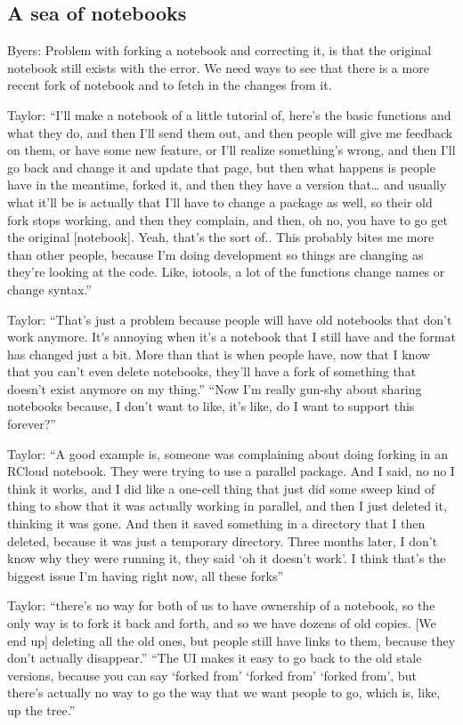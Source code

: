 \subsection{A sea of notebooks}

Byers: Problem with forking a notebook and correcting it, is that the original notebook still exists with the error.  We need ways to see that there is a more recent fork of notebook and to fetch in the changes from it.

Taylor: ``I'll make a notebook of a little tutorial of, here's the basic functions and what they do, and then I'll send them out, and then people will give me feedback on them, or have some new feature, or I'll realize something's wrong, and then I'll go back and change it and update that page, but then what happens is people have in the meantime, forked it, and then they have a version that… and usually what it'll be is actually that I'll have to change a package as well, so their old fork stops working, and then they complain, and then, oh no, you have to go get the original [notebook]. Yeah, that's the sort of.. This probably bites me more than other people, because I'm doing development so things are changing as they're looking at the code. Like, iotools, a lot of the functions change names or change syntax.''

Taylor: ``That's just a problem because people will have old notebooks that don't work anymore. It's annoying when it's a notebook that I still have and the format has changed just a bit. More than that is when people have, now that I know that you can't even delete notebooks, they'll have a fork of something that doesn't exist anymore on my thing.'' ``Now I'm really gun-shy about sharing notebooks because, I don't want to like, it's like, do I want to support this forever?''

Taylor: ``A good example is, someone was complaining about doing forking in an RCloud notebook. They were trying to use a parallel package. And I said, no no I think it works, and I did like a one-cell thing that just did some sweep kind of thing to show that it was actually working in parallel, and then I just deleted it, thinking it was gone. And then it saved something in a directory that I then deleted, because it was just a temporary directory. Three months later, I don't know why they were running it, they said `oh it doesn't work'. I think that's the biggest issue I'm having right now, all these forks''

Taylor: ``there's no way for both of us to have ownership of a notebook, so the only way is to fork it back and forth, and so we have dozens of old copies. [We end up] deleting all the old ones, but people still have links to them, because they don't actually disappear.'' ``The UI makes it easy to go back to the old stale versions, because you can say `forked from' `forked from' `forked from', but there's actually no way to go the way that we want people to go, which is, like, up the tree.''

